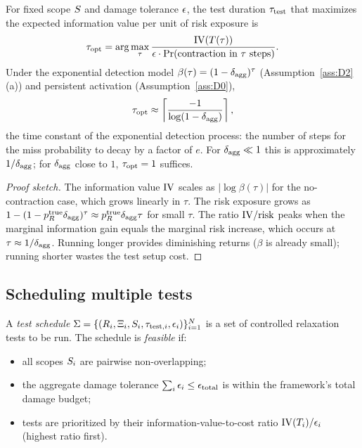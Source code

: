 \begin{proposition}
\label{prop:tau_opt}
For fixed scope $S$ and damage tolerance $\epsilon$,
the test duration $\tau_{\mathrm{test}}$ that maximizes the expected
information value per unit of risk exposure is
\begin{equation}
\label{eq:tau_opt}
\tau_{\mathrm{opt}} = \arg\max_{\tau}
  \frac{\mathrm{IV}(T(\tau))}{\epsilon \cdot \Pr(\text{contraction in } \tau \text{ steps})}.
\end{equation}
Under the exponential detection model
$\beta(\tau) = (1 - \delta_{\mathrm{agg}})^{\tau}$
(Assumption~\ref{ass:D2}(a)) and persistent activation
(Assumption~\ref{ass:D0}),
\begin{equation}
\label{eq:tau_opt_explicit}
\tau_{\mathrm{opt}} \approx \left\lceil \frac{-1}{\log(1 - \delta_{\mathrm{agg}})} \right\rceil,
\end{equation}
the time constant of the exponential detection process: the
number of steps for the miss probability to decay by a factor
of $e$.  For $\delta_{\mathrm{agg}} \ll 1$ this is approximately
$1/\delta_{\mathrm{agg}}$; for $\delta_{\mathrm{agg}}$ close to $1$, $\tau_{\mathrm{opt}} = 1$
suffices.
\end{proposition}

\begin{proof}[Proof sketch]
The information value $\mathrm{IV}$ scales as $|\log \beta(\tau)|$ for
the no-contraction case, which grows linearly in $\tau$.  The
risk exposure grows as
$1 - (1 - p_R^{\mathrm{true}} \delta_{\mathrm{agg}})^{\tau}
 \approx p_R^{\mathrm{true}} \delta_{\mathrm{agg}} \tau$
for small $\tau$.  The ratio $\mathrm{IV}/\mathrm{risk}$ peaks when the
marginal information gain equals the marginal risk increase,
which occurs at $\tau \approx 1/\delta_{\mathrm{agg}}$.  Running longer
provides diminishing returns ($\beta$ is already small); running
shorter wastes the test setup cost.
\end{proof}

\subsection{Scheduling multiple tests}

\begin{definition}
\label{def:test_schedule}
A \emph{test schedule}
$\Sigma = \{(R_i, \Xi_i, S_i, \tau_{\mathrm{test},i},
   \epsilon_i)\}_{i=1}^{N}$
is a set of controlled relaxation tests to be run.  The schedule
is \emph{feasible} if:
\begin{itemize}
\item[(i)] all scopes $S_i$ are pairwise non-overlapping;
\item[(ii)] the aggregate damage tolerance
  $\sum_i \epsilon_i \leq \epsilon_{\mathrm{total}}$ is
  within the framework's total damage budget;
\item[(iii)] tests are prioritized by their
  information-value-to-cost ratio
  $\mathrm{IV}(T_i) / \epsilon_i$ (highest ratio first).
\end{itemize}
\end{definition}

